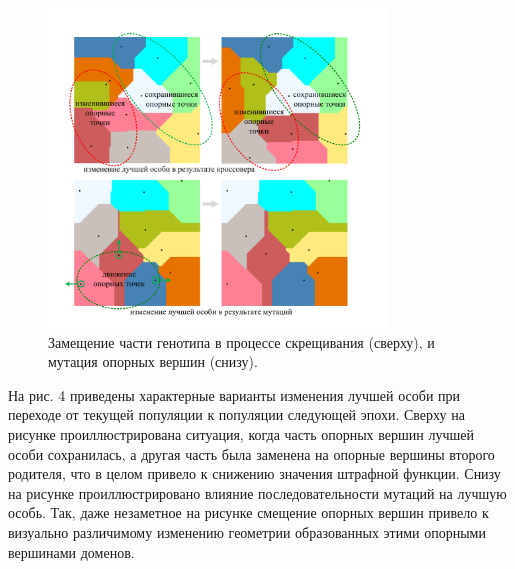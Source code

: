 \begin{figure}[ht]
	\centering
		\includegraphics[width=0.8\textwidth]{./pics/text_2_genetic/changes.pdf}
	\caption{Замещение части генотипа в процессе скрещивания (сверху), и мутация опорных вершин (снизу).}
	\label{fig:text_2_genetic_changes}
\end{figure}

На рис. 4 приведены характерные варианты изменения лучшей особи при переходе от текущей популяции к популяции следующей эпохи.
Сверху на рисунке проиллюстрирована ситуация, когда часть опорных вершин лучшей особи сохранилась, а другая часть была заменена на опорные вершины второго родителя, что в целом привело к снижению значения штрафной функции.
Снизу на рисунке проиллюстрировано влияние последовательности мутаций на лучшую особь.
Так, даже незаметное на рисунке смещение опорных вершин привело к визуально различимому изменению геометрии образованных этими опорными вершинами доменов.

